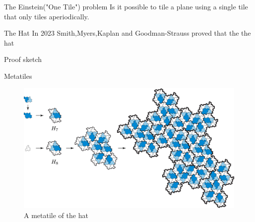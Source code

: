 \documentclass{beamer}
\begin{document}
\begin{frame}{The Einstein("One Tile") problem}
    Is it possible to tile a plane using a single tile that only tiles aperiodically.
\end{frame}

\begin{frame}{The Hat}
    In 2023 Smith,Myers,Kaplan and Goodman-Strauss proved that the the hat
\end{frame}

\begin{frame}{Proof sketch}
    
\end{frame}

\begin{frame}{Metatiles}
    \begin{figure}
        \centering
        \includegraphics[page=1,width=\textwidth]{images/aperiodic-pdfs/alt_subst.pdf}
        \caption{A metatile of the hat}
        \label{fig:hat-metatile}
    \end{figure}
\end{frame}

\end{document}
